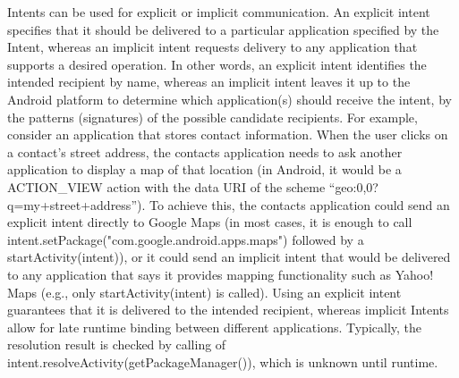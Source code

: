 Intents can be used for explicit or implicit communication. An explicit intent specifies that it should be delivered to a particular application specified by the Intent, whereas an implicit intent requests delivery to any application that supports a desired operation. In other words, an explicit intent identifies the intended recipient by name, whereas an implicit intent leaves it up to the Android platform to determine which application(s) should receive the intent, by the patterns (signatures) of the possible candidate recipients. For example, consider an application that stores contact information. When the user clicks on a contact's street address, the contacts application needs to ask another application to display a map of that location (in Android, it would be a \textsf{ACTION\_VIEW} action with the data URI of the scheme ``\textsf{geo:0,0?q=my+street+address}''). To achieve this, the contacts application could send an explicit intent directly to Google Maps (in most cases, it is enough to call \textsf{intent.setPackage("com.google.android.apps.maps")} followed by a \textsf{startActivity(intent)}), or it could send an implicit intent that would be delivered to any application that says it provides mapping functionality such as Yahoo! Maps (e.g., only \textsf{startActivity(intent)} is called). Using an explicit intent guarantees that it is delivered to the intended recipient, whereas implicit Intents allow for late runtime binding between different applications. {Typically, the resolution result is checked by calling of \textsf{intent.resolveActivity(getPackageManager())}, which is unknown until runtime.}
